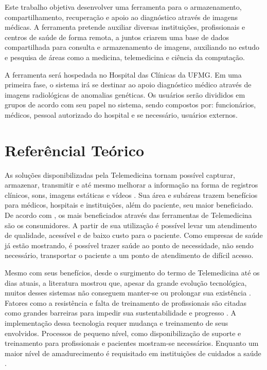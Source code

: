 Este trabalho objetiva desenvolver uma ferramenta para o armazenamento, compartilhamento, recuperação e apoio ao diagnóstico através de imagens médicas.
A ferramenta pretende auxiliar diversas instituições, profissionais e centros de saúde de forma remota, a juntos criarem uma base de dados compartilhada para consulta e armazenamento de imagens, auxiliando no estudo e pesquisa de áreas como a medicina, telemedicina e ciência da computação.

A ferramenta será hospedada no Hospital das Clínicas da UFMG.
Em uma primeira fase, o sistema irá se destinar ao apoio diagnóstico médico através de imagens radiológicas de anomalias genéticas.
Os usuários serão divididos em grupos de acordo com seu papel no sistema, sendo compostos por: funcionários, médicos, pessoal autorizado do hospital e se necessário, usuários externos.

\section{\esp Referêncial Teórico}

As soluções disponibilizadas pela Telemedicina tornam possível capturar, armazenar, transmitir e até mesmo melhorar a informação na forma de registros clínicos, sons, imagens estáticas e vídeos \cite{REF02}.
Sua área e subáreas trazem benefícios para médicos, hospitais e instituições, além do paciente, seu maior beneficiado.
De acordo com \cite{REF04}, os mais beneficiados através das ferramentas de Telemedicina são os consumidores.
A partir de sua utilização é possível levar um atendimento de qualidade, acessível e de baixo custo para o paciente.
Como empresas de saúde já estão mostrando, é possível trazer saúde ao ponto de necessidade, não sendo necessário, transportar o paciente a um ponto de atendimento de difícil acesso.

Mesmo com seus benefícios, desde o surgimento do termo de Telemedicina até os dias atuais, a literatura mostrou que, apesar da grande evolução tecnológica, muitos desses sistemas não conseguem manter-se ou prolongar sua existência \cite{REF16}.
Fatores como a resistência e falta de treinamento de profissionais são citadas como grandes barreiras para impedir sua sustentabilidade e progresso \cite{REF03}.
A implementação dessa tecnologia requer mudança e treinamento de seus envolvidos.
Processos de pequeno nível, como disponibilização de suporte e treinamento para profissionais e pacientes mostram-se necessários.
Enquanto um maior nível de amadurecimento é requisitado em instituições de cuidados a saúde \cite{REF06}.

